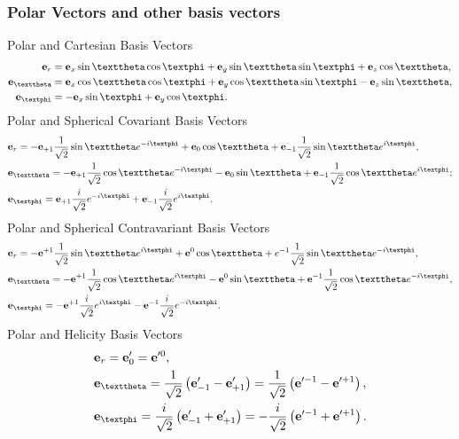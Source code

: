 \subsubsection{Polar Vectors and other basis vectors}
  Polar and Cartesian Basis Vectors
\begin{align}
\vect{e}_{r} & =\vect{e}_{x} \sin \vartheta \cos \varphi+\vect{e}_{y} \sin \vartheta \sin \varphi+\vect{e}_{z} \cos \vartheta,  \notag\\
\vect{e}_{\vartheta} & =\vect{e}_{x} \cos \vartheta \cos \varphi+\vect{e}_{y} \cos \vartheta \sin \varphi-\vect{e}_{z} \sin \vartheta,  \label{eq:1:1:33}\\
\vect{e}_{\varphi} & =-\vect{e}_{x} \sin \varphi+\vect{e}_{y} \cos \varphi . \notag
\end{align}
Polar and Spherical Covariant Basis Vectors
\begin{align}
& \vect{e}_{r}=-\vect{e}_{+1} \frac{1}{\sqrt{2}} \sin \vartheta e^{-i \varphi}+\vect{e}_{0} \cos \vartheta+\vect{e}_{-1} \frac{1}{\sqrt{2}} \sin \vartheta e^{i \varphi},  \notag\\
& \vect{e}_{\vartheta}=-\vect{e}_{+1} \frac{1}{\sqrt{2}} \cos \vartheta e^{-i \varphi}-\vect{e}_{0} \sin \vartheta+\vect{e}_{-1} \frac{1}{\sqrt{2}} \cos \vartheta e^{i \varphi} ;  \label{eq:1:1:34}\\
& \vect{e}_{\varphi}=\vect{e}_{+1} \frac{i}{\sqrt{2}} e^{-i \varphi}+\vect{e}_{-1} \frac{i}{\sqrt{2}} e^{i \varphi} . \notag
\end{align}
Polar and Spherical Contravariant Basis Vectors
\begin{align}
& \vect{e}_{r}=-\vect{e}^{+1} \frac{1}{\sqrt{2}} \sin \vartheta e^{i \varphi}+\vect{e}^{0} \cos \vartheta+e^{-1} \frac{1}{\sqrt{2}} \sin \vartheta e^{-i \varphi},  \notag\\
& \vect{e}_{\vartheta}=-\vect{e}^{+1} \frac{1}{\sqrt{2}} \cos \vartheta e^{i \varphi}-\vect{e}^{0} \sin \vartheta+\vect{e}^{-1} \frac{1}{\sqrt{2}} \cos \vartheta e^{-i \varphi},  \label{eq:1:1:35}\\
& \vect{e}_{\varphi}=-\vect{e}^{+1} \frac{i}{\sqrt{2}} e^{i \varphi}-\vect{e}^{-1} \frac{i}{\sqrt{2}} e^{-i \varphi} . \notag
\end{align}
Polar and Helicity Basis Vectors
\begin{align}
& \vect{e}_{r}=\vect{e}_{0}^{\prime}=\vect{e}^{\prime 0},  \notag\\
& \vect{e}_{\vartheta}=\frac{1}{\sqrt{2}}\left(\vect{e}_{-1}^{\prime}-\vect{e}_{+1}^{\prime}\right)=\frac{1}{\sqrt{2}}\left(\vect{e}^{\prime-1}-\vect{e}^{\prime+1}\right),  \label{eq:1:1:36}\\
& \vect{e}_{\varphi}=\frac{i}{\sqrt{2}}\left(\vect{e}_{-1}^{\prime}+\vect{e}_{+1}^{\prime}\right)=-\frac{i}{\sqrt{2}}\left(\vect{e}^{\prime-1}+\vect{e}^{\prime+1}\right) . \notag
\end{align}
